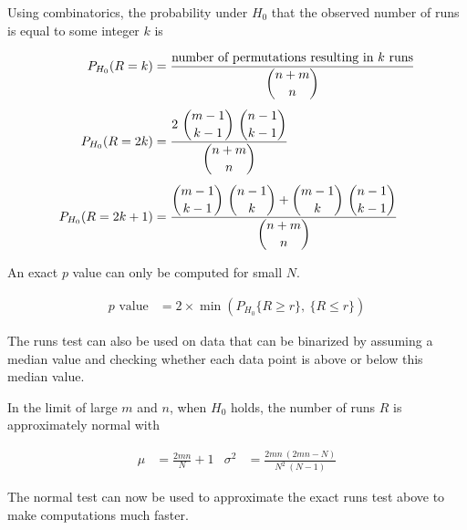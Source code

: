 Using combinatorics, the probability under $ H_0 $ that the observed number of runs is equal to some integer $ k $ is

\begin{align}
	P_{H_0}(R = k) &= \frac{\displaystyle \text{number of permutations resulting in $ k $ runs}}{\displaystyle \binom{n+m}{n}} \\[1ex]
	P_{H_0}(R = 2k) &= \frac{\displaystyle 2\ \binom{m-1}{k-1}\ \binom{n-1}{k-1}}{\displaystyle \binom{n+m}{n}} \\[1ex]
	P_{H_0}(R = 2k + 1) &= \frac{\displaystyle \binom{m-1}{k-1}\ \binom{n-1}{k} + \binom{m-1}{k}\ \binom{n-1}{k-1}}{\displaystyle \binom{n+m}{n}}
\end{align}

An exact $ p $ value can only be computed for small $ N $.

\begin{align}
	p \text{ value} &= 2 \times \min(P_{H_0}\{R \geq r\},\ \{R \leq r\})
\end{align}

The runs test can also be used on data that can be binarized by assuming a median value and checking whether each data point is above or below this median value.

In the limit of large $ m $ and $ n $, when $ H_0 $ holds, the number of runs $ R $ is approximately normal with 

\begin{align}
	\mu &= \frac{2mn}{N} + 1 & \sigma^2 &= \frac{2mn\ (2mn - N)}{N^2\ (N-1)}
\end{align}

The normal test can now be used to approximate the exact runs test above to make computations much faster.



